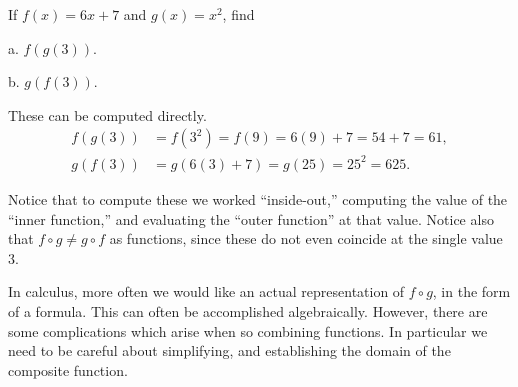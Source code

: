 \bex If $f(x)=6x+7$ and $g(x)=x^2$, find
\begin{description}
\item a. $f(g(3))$.
\item b. $g(f(3))$.
\end{description}
These can be computed directly.
\begin{align*}
f(g(3))&=f(3^2)=f(9)=6(9)+7=54+7=61,\\
g(f(3))&=g(6(3)+7)=g(25)=25^2=625.\end{align*}
\eex

Notice that to compute these we worked ``inside-out,''
computing the value of the ``inner function,'' and evaluating
the ``outer function'' at that value.  Notice also that
$f\circ g\ne g\circ f$ as functions, since these do not
even coincide at the single value $3$.


In calculus, more often we would like an actual representation
of $f\circ g$, in the form of a formula.  This can often be accomplished
algebraically. However, there are some complications which arise
when so combining functions.  In particular we need to be
careful about simplifying, and establishing the domain of the
composite function.

